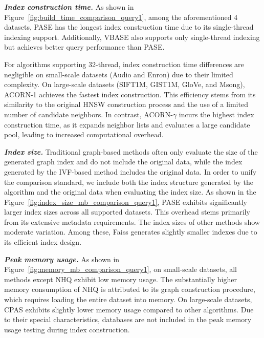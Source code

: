 \documentclass[sigconf, nonacm]{acmart}
\begin{document}
\textit{\textbf{Index construction time.}}
As shown in Figure~\ref{fig:build_time_comparison_query1}, among the aforementioned 4 datasets, PASE has the longest index construction time due to its single-thread indexing support. Additionally, VBASE also supports only single-thread indexing but achieves better query performance than PASE.

For algorithms supporting 32-thread, index construction time differences are negligible on small-scale datasets (Audio and Enron) due to their limited complexity. On large-scale datasets (SIFT1M, GIST1M, GloVe, and Msong), ACORN-1 achieves the fastest index construction. This efficiency stems from its similarity to the original HNSW construction process and the use of a limited number of candidate neighbors. In contrast, ACORN-$\gamma$ incurs the highest index construction time, as it expands neighbor lists and evaluates a large candidate pool, leading to increased computational overhead.


\textit{\textbf{Index size.}}
Traditional graph-based methods often only evaluate the size of the generated graph index and do not include the original data, while the index generated by the IVF-based method includes the original data. In order to unify the comparison standard, 
we include both the index structure generated by the algorithm and the original data when evaluating the index size. 
As shown in the Figure~\ref{fig:index_size_mb_comparison_query1}, PASE exhibits significantly larger index sizes across all supported datasets. This overhead stems primarily from its extensive metadata requirements. The index sizes of other methods show moderate variation. Among these, Faiss generates slightly smaller indexes due to its efficient index design.



\textit{\textbf{Peak memory usage.}}
As shown in Figure~\ref{fig:memory_mb_comparison_query1}, on small-scale datasets, all methods except NHQ exhibit low memory usage. The substantially higher memory consumption of NHQ is attributed to its graph construction procedure, which requires loading the entire dataset into memory. On large-scale datasets, CPAS exhibits slightly lower memory usage compared to other algorithms. Due to their special characteristics, databases are not included in the peak memory usage testing during index construction.
\end{document}
